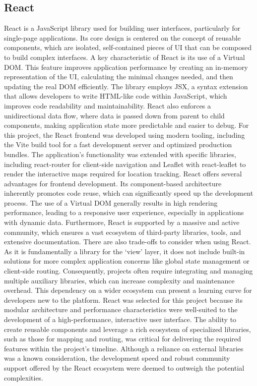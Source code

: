\subsection{React}
React is a JavaScript library used for building user interfaces, particularly for single-page applications. Its core design is centered on the concept of reusable components, which are isolated, self-contained pieces of UI that can be composed to build complex interfaces. A key characteristic of React is its use of a Virtual DOM. This feature improves application performance by creating an in-memory representation of the UI, calculating the minimal changes needed, and then updating the real DOM efficiently.  
The library employs JSX, a syntax extension that allows developers to write HTML-like code within JavaScript, which improves code readability and maintainability. React also enforces a unidirectional data flow, where data is passed down from parent to child components, making application state more predictable and easier to debug. For this project, the React frontend was developed using modern tooling, including the Vite build tool for a fast development server and optimized production bundles. The application's functionality was extended with specific libraries, including react-router for client-side navigation and Leaflet with react-leaflet to render the interactive maps required for location tracking.  
React offers several advantages for frontend development. Its component-based architecture inherently promotes code reuse, which can significantly speed up the development process. The use of a Virtual DOM generally results in high rendering performance, leading to a responsive user experience, especially in applications with dynamic data. Furthermore, React is supported by a massive and active community, which ensures a vast ecosystem of third-party libraries, tools, and extensive documentation.  
There are also trade-offs to consider when using React. As it is fundamentally a library for the ‘view’ layer, it does not include built-in solutions for more complex application concerns like global state management or client-side routing. Consequently, projects often require integrating and managing multiple auxiliary libraries, which can increase complexity and maintenance overhead. This dependency on a wider ecosystem can present a learning curve for developers new to the platform.  
React was selected for this project because its modular architecture and performance characteristics were well-suited to the development of a high-performance, interactive user interface. The ability to create reusable components and leverage a rich ecosystem of specialized libraries, such as those for mapping and routing, was critical for delivering the required features within the project's timeline. Although a reliance on external libraries was a known consideration, the development speed and robust community support offered by the React ecosystem were deemed to outweigh the potential complexities.

